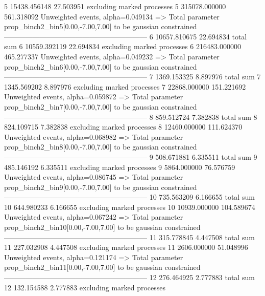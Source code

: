 5          15438.456148    27.503951       excluding marked processes    
5          315078.000000   561.318092      Unweighted events, alpha=0.049134
  => Total parameter prop_binch2_bin5[0.00,-7.00,7.00] to be gaussian constrained
------------------------------------------------------------
6          10657.810675    22.694834       total sum                     
6          10559.392119    22.694834       excluding marked processes    
6          216483.000000   465.277337      Unweighted events, alpha=0.049232
  => Total parameter prop_binch2_bin6[0.00,-7.00,7.00] to be gaussian constrained
------------------------------------------------------------
7          1369.153325     8.897976        total sum                     
7          1345.569202     8.897976        excluding marked processes    
7          22868.000000    151.221692      Unweighted events, alpha=0.059872
  => Total parameter prop_binch2_bin7[0.00,-7.00,7.00] to be gaussian constrained
------------------------------------------------------------
8          859.512724      7.382838        total sum                     
8          824.109715      7.382838        excluding marked processes    
8          12460.000000    111.624370      Unweighted events, alpha=0.068982
  => Total parameter prop_binch2_bin8[0.00,-7.00,7.00] to be gaussian constrained
------------------------------------------------------------
9          508.671881      6.335511        total sum                     
9          485.146192      6.335511        excluding marked processes    
9          5864.000000     76.576759       Unweighted events, alpha=0.086745
  => Total parameter prop_binch2_bin9[0.00,-7.00,7.00] to be gaussian constrained
------------------------------------------------------------
10         735.563209      6.166655        total sum                     
10         644.980233      6.166655        excluding marked processes    
10         10939.000000    104.589674      Unweighted events, alpha=0.067242
  => Total parameter prop_binch2_bin10[0.00,-7.00,7.00] to be gaussian constrained
------------------------------------------------------------
11         315.778845      4.447508        total sum                     
11         227.032908      4.447508        excluding marked processes    
11         2606.000000     51.048996       Unweighted events, alpha=0.121174
  => Total parameter prop_binch2_bin11[0.00,-7.00,7.00] to be gaussian constrained
------------------------------------------------------------
12         276.464925      2.777883        total sum                     
12         132.154588      2.777883        excluding marked processes    
